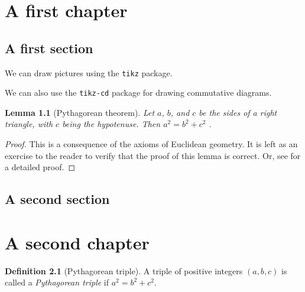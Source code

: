 \documentclass{report}
\theoremstyle{plain}
\newtheorem{lemma}[subsection]{Lemma}
\theoremstyle{definition}
\newtheorem{definition}[subsection]{Definition}
\theoremstyle{remark}
\numberwithin{equation}{subsection}
\begin{document}
\chapter{A first chapter}
\label{chapter:first}

\section{A first section}

We can draw pictures using the \texttt{tikz} package.
\begin{center}
\end{center}

We can also use the \texttt{tikz-cd} package for drawing commutative diagrams.
\begin{center}
\end{center}

\label{section:first}

\begin{lemma}[Pythagorean theorem]
  \label{lemma:pythagoras}
  Let $a$, $b$, and $c$ be the sides of a right triangle, with $c$ being the hypotenuse. Then $a^2=b^2+c^2$ \cite{Euclid}.
\end{lemma}
\begin{proof}
  This is a consequence of the axioms of Euclidean geometry. It is left as an 
  exercise to the reader to verify that the proof of this lemma is correct. Or, see \cite{Euclid2} for a detailed proof.
\end{proof}




\section{A second section}
\label{section:second}


\chapter{A second chapter}
\label{chapter:second}

\begin{definition}[Pythagorean triple]
  \label{definition:pythagorean-triple}
  A triple of positive integers $(a,b,c)$ is called a \emph{Pythagorean triple} if $a^2=b^2+c^2$.
\end{definition}
\end{document}
